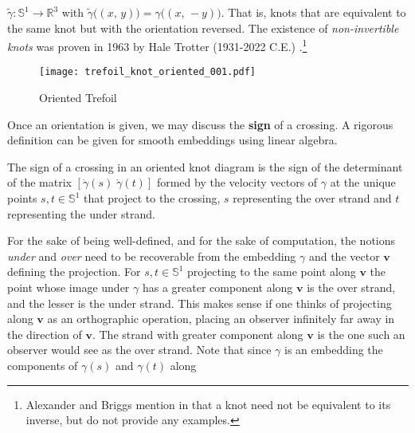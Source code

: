         $\tilde{\gamma}:\mathbb{S}^{1}\rightarrow\mathbb{R}^{3}$ with
        $\tilde{\gamma}\big((x,\,y)\big)=\gamma\big((x,\,-y)\big)$. That is,
        knots that are equivalent to the same knot but with the orientation
        reversed. The existence of \textit{non-invertible knots} was proven in
        1963 by Hale Trotter (1931-2022 C.E.)
        \cite{TrotterInvertibleKnots1963}.\footnote{%
            Alexander and Briggs mention in
            \cite[p.~563-564]{AlexanderBriggs1926} that a knot need not
            be equivalent to its inverse, but do not provide any examples.
        }
        \par\hfill\par
        \begin{figure}
            \centering
            \texttt{[image: trefoil\_knot\_oriented\_001.pdf]}
            \caption{Oriented Trefoil}
            \label{fig:trefoil_knot_oriented_001}
        \end{figure}
        Once an orientation is given, we may discuss the \textbf{sign} of a
        crossing. A rigorous definition can be given for smooth embeddings using
        linear algebra.
        \begin{definition}
            The sign of a crossing in an oriented knot diagram is the sign of
            the determinant of the matrix $[\dot{\gamma}(s)\;\dot{\gamma}(t)]$
            formed by the velocity vectors of $\gamma$ at the unique points
            $s,t\in\mathbb{S}^{1}$ that project to the crossing, $s$
            representing the over strand and $t$ representing the under strand.
        \end{definition}
        For the sake of being well-defined, and for the sake of computation, the
        notions \textit{under} and \textit{over} need to be recoverable from the
        embedding $\gamma$ and the vector $\mathbf{v}$ defining the projection.
        For $s,t\in\mathbb{S}^{1}$ projecting to the same point along
        $\mathbf{v}$ the point whose image under $\gamma$ has a greater
        component along $\mathbf{v}$ is the over strand, and the lesser
        is the under strand. This makes sense if one thinks of projecting
        along $\mathbf{v}$ as an orthographic operation, placing an observer
        infinitely far away in the direction of $\mathbf{v}$. The strand
        with greater component along $\mathbf{v}$ is the one such an
        observer would see as the over strand. Note that since $\gamma$ is
        an embedding the components of $\gamma(s)$ and $\gamma(t)$ along
